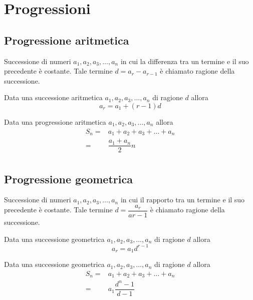 
\chapter{Progressioni}
\section{Progressione aritmetica}
\begin{defn}\label{defn:ProgAritm1}
	Successione di numeri $a_1,a_2,a_3,\dots,a_n$ in cui la differenza tra un termine e il suo precedente è costante. Tale termine $d=a_r-a_{r-1}$ è chiamato ragione della successione.
\end{defn}
\begin{prop}
	Data una successione aritmetica $a_1,a_2,a_3,\dots,a_n$ di ragione $d$ allora\[a_r=a_1+(r-1)d\]
\end{prop}
\begin{thm}\label{thm:SommaProgAritm1}
Data una progressione aritmetica $a_1,a_2,a_3,\dots,a_n$ allora
\begin{align*}
	S_n=&a_1+a_2+a_3+\dots+a_n\\
	=&\dfrac{a_1+a_n}{2}n\\
\end{align*}
\end{thm}
\section{Progressione geometrica}
\begin{defn}\label{defn:ProgGeom1}
		Successione di numeri $a_1,a_2,a_3,\dots,a_n$ in cui il rapporto tra un termine e il suo precedente è costante. Tale termine $d=\dfrac{a_r}{a{r-1}}$ è chiamato ragione della successione.
\end{defn}
\begin{prop}
	Data una successione geometrica $a_1,a_2,a_3,\dots,a_n$ di ragione $d$ allora\[a_r=a_1d^{r-1}\]
\end{prop}
\begin{thm}\label{thm:SommaProgGeo}
		Data una successione geometrica $a_1,a_2,a_3,\dots,a_n$ di ragione $d$ allora 
		\begin{align*}
			S_n=&a_1+a_2+a_3+\dots+a_n\\
			=&a_1\dfrac{d^n-1}{d-1}
		\end{align*}
\end{thm}
